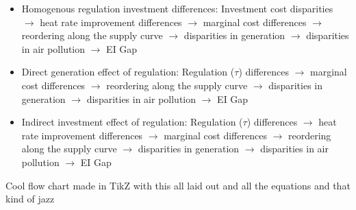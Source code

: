 \begin{itemize}
    \item Homogenous regulation investment differences: Investment cost disparities $\rightarrow$ heat rate improvement differences $\rightarrow$ marginal cost differences $\rightarrow$ reordering along the supply curve $\rightarrow$ disparities in generation $\rightarrow$ disparities in air pollution $\rightarrow$ EI Gap
    \item Direct generation effect of regulation: Regulation ($\tau$) differences $\rightarrow$ marginal cost differences $\rightarrow$ reordering along the supply curve $\rightarrow$ disparities in generation $\rightarrow$ disparities in air pollution $\rightarrow$ EI Gap
    \item Indirect investment effect of regulation: Regulation ($\tau$) differences $\rightarrow$ heat rate improvement differences $\rightarrow$ marginal cost differences $\rightarrow$ reordering along the supply curve $\rightarrow$ disparities in generation $\rightarrow$ disparities in air pollution $\rightarrow$ EI Gap
\end{itemize}

Cool flow chart made in TikZ with this all laid out and all the equations and that kind of jazz



















